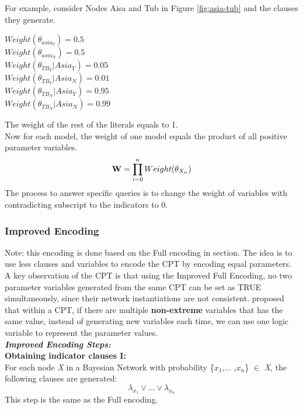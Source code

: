         For example, consider Nodes Aisa and Tub in Figure \ref{fig:asia-tub} and the clauses they generate. 
        \begin{center}
            $Weight(\theta_{asia_{Y}}) = 0.5$\\
            $Weight(\theta_{asia_{N}}) = 0.5$\\
            $Weight(\theta_{TB_{Y}}|Asia_{Y}) = 0.05$\\
            $Weight(\theta_{TB_{Y}}|Asia_{N}) = 0.01$\\
            $Weight(\theta_{TB_{N}}|Asia_{Y}) = 0.95$\\
            $Weight(\theta_{TB_{N}}|Asia_{N}) = 0.99$\\
        \end{center}
        The weight of the rest of the literals equals to 1. \\
        
        Now for each model, the weight of one model equals the product of all positive parameter variables. 
        $$\textbf{\textbf{W}} = \prod_{i = 0}^{n} Weight(\theta_{X_{n}}) $$
        The process to answer specific queries is to change the weight of variables with contradicting subscript to the indicators to 0.
        
        
        \subsubsection{Improved Encoding}
        Note: this encoding is done based on the Full encoding in section. 
        The idea is to use less clauses and variables to encode the CPT by encoding equal parameters. A key observation of the CPT is that using the Improved Full Encoding, no two parameter variables generated from the same CPT can be set as TRUE simultaneously, since their network instantiations are not consistent. \cite{enc2} proposed that within a CPT, if there are multiple \textbf{non-extreme} variables that has the same value, instead of generating new variables each time, we can use one logic variable to represent the parameter values.\\
        
        \noindent \textbf{\textit{Improved Encoding Steps:}}\\
        \textbf{Obtaining indicator clauses \textsc{I}:}\\
        For each node \textit{X} in a Bayesian Network with probability \{$x_{1}$,... ,$x_{n}$\} $\in$ \textit{X}, the following clauses are generated:
        \begin{equation}\label{Improvedenc_ic}
            \lambda_{x_{1}} \vee ... \vee \lambda_{x_{n}}
        \end{equation}
        This step is the same as the Full encoding.\\

